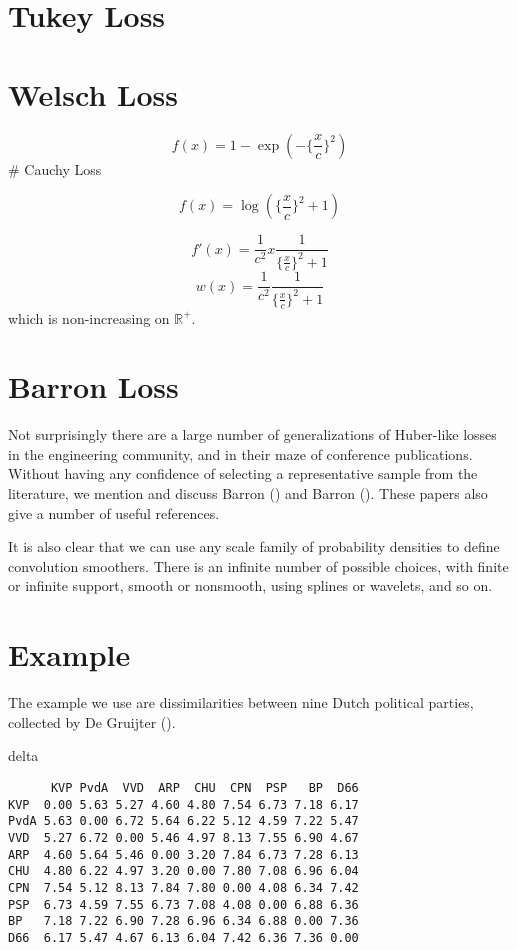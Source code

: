 \documentclass[
  12pt,
  letterpaper,
  DIV=11,
  numbers=noendperiod]{scrartcl}
\newenvironment{Shaded}{\begin{snugshade}}{\end{snugshade}}
\newcommand{\NormalTok}[1]{\textcolor[rgb]{0.00,0.23,0.31}{#1}}
\newcommand{\sectionbreak}{\pagebreak}
\begin{document}
\sectionbreak

\section{Tukey Loss}\label{tukey-loss}

\section{Welsch Loss}\label{welsch-loss}

\[
f(x)=1-\exp(-\{\frac{x}{c}\}^2)
\] \# Cauchy Loss

\[
f(x)=\log(\{\frac{x}{c}\}^2+1)
\]

\[
f'(x)=\frac{1}{c^2}x\frac{1}{\{\frac{x}{c}\}^2+1}
\] \[
w(x)=\frac{1}{c^2}\frac{1}{\{\frac{x}{c}\}^2+1}
\] which is non-increasing on \(\mathbb{R}^+\).

\section{Barron Loss}\label{barron-loss}

Not surprisingly there are a large number of generalizations of
Huber-like losses in the engineering community, and in their maze of
conference publications. Without having any confidence of selecting a
representative sample from the literature, we mention and discuss Barron
() and Barron
(). These papers also give a number of
useful references.

It is also clear that we can use any scale family of probability
densities to define convolution smoothers. There is an infinite number
of possible choices, with finite or infinite support, smooth or
nonsmooth, using splines or wavelets, and so on.

\section{Example}\label{example}

The example we use are dissimilarities between nine Dutch political
parties, collected by De Gruijter ().

\begin{Shaded}
\begin{Highlighting}[]
\NormalTok{delta}
\end{Highlighting}
\end{Shaded}

\begin{verbatim}
      KVP PvdA  VVD  ARP  CHU  CPN  PSP   BP  D66
KVP  0.00 5.63 5.27 4.60 4.80 7.54 6.73 7.18 6.17
PvdA 5.63 0.00 6.72 5.64 6.22 5.12 4.59 7.22 5.47
VVD  5.27 6.72 0.00 5.46 4.97 8.13 7.55 6.90 4.67
ARP  4.60 5.64 5.46 0.00 3.20 7.84 6.73 7.28 6.13
CHU  4.80 6.22 4.97 3.20 0.00 7.80 7.08 6.96 6.04
CPN  7.54 5.12 8.13 7.84 7.80 0.00 4.08 6.34 7.42
PSP  6.73 4.59 7.55 6.73 7.08 4.08 0.00 6.88 6.36
BP   7.18 7.22 6.90 7.28 6.96 6.34 6.88 0.00 7.36
D66  6.17 5.47 4.67 6.13 6.04 7.42 6.36 7.36 0.00
\end{verbatim}
\end{document}
